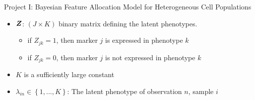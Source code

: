 \documentclass[ignorenonframetext,]{beamer}
\providecommand{\tightlist}{%
  \setlength{\itemsep}{0pt}\setlength{\parskip}{0pt}}
\newcommand{\bc}[1]{ \left\{#1\right\} }
\newcommand{\bZ}{\mbox{\boldmath $Z$}}
\begin{document}
\begin{frame}{Project I: Bayesian Feature Allocation Model for
Heterogeneous Cell Populations}

\begin{itemize}
\item
  \(\bZ\): \((J \times K)\) binary matrix defining the latent
  phenotypes.

  \begin{itemize}
  \item
    if \(Z_{jk} = 1\), then marker \(j\) is expressed in phenotype \(k\)
  \item
    if \(Z_{jk} = 0\), then marker \(j\) is not expressed in phenotype
    \(k\)
  \end{itemize}
\item $K$ is a sufficiently large constant
\item
  \(\lambda_{in} \in \bc{1,...,K}\): The latent phenotype of observation
  \(n\), sample \(i\)
\end{itemize}
\end{frame}
\end{document}
